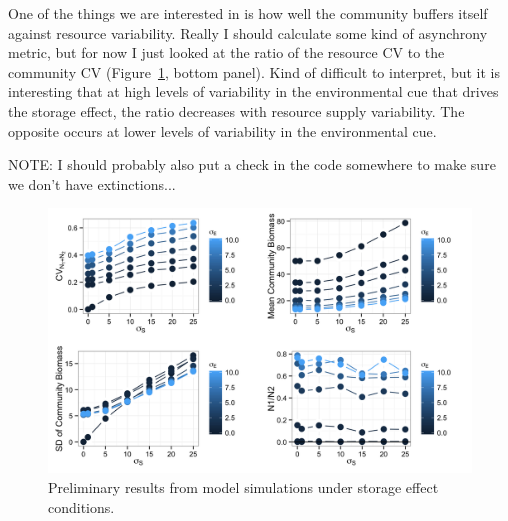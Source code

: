 \documentclass[12pt]{article}
\begin{document}
One of the things we are interested in is how well the community buffers itself against resource variability. Really I should calculate some kind of asynchrony metric, but for now I just looked at the ratio of the resource CV to the community CV (Figure~\ref{fig:storeEffSims}, bottom panel). Kind of difficult to interpret, but it is interesting that at high levels of variability in the environmental cue that drives the storage effect, the ratio decreases with resource supply variability. The opposite occurs at lower levels of variability in the environmental cue.

NOTE: I should probably also put a check in the code somewhere to make sure we don't have extinctions...

\begin{figure}
\centering
\includegraphics[width=1\textwidth]{"CV_FourPanel"}
\caption{Preliminary results from model simulations under storage effect conditions.}
 \label{fig:storeEffSims}
\end{figure}
\end{document}
